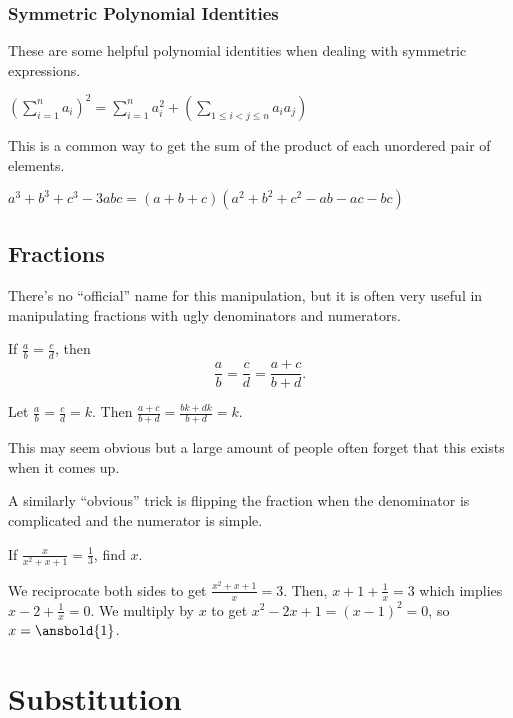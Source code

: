 \documentclass[mast]{lucky}
\begin{document}
\subsubsection{Symmetric Polynomial Identities}
These are some helpful polynomial identities when dealing with symmetric expressions.
\begin{theo}
$(\sum_{i=1}^{n} a_{i})^2 = \sum_{i=1}^{n} a_{i}^2 + (\sum_{1\leq i < j\leq n } a_{i}a_{j})$
\end{theo}
This is a common way to get the sum of the product of each unordered pair of elements. 
\begin{theo}
$a^3+b^3+c^3-3abc=(a+b+c)(a^2+b^2+c^2-ab-ac-bc)$
\end{theo}

\subsection{Fractions}
There's no ``official'' name for this manipulation, but it is often very useful in manipulating fractions with ugly denominators and numerators. 
\begin{theo}
If $\frac{a}{b}=\frac{c}{d}$, then
\[\frac{a}{b}=\frac{c}{d}=\frac{a+c}{b+d}.\]
\end{theo}

\begin{pro}
Let $\frac{a}{b}=\frac{c}{d}=k$. Then $\frac{a+c}{b+d}=\frac{bk+dk}{b+d}=k$.
\end{pro}

This may seem obvious but a large amount of people often forget that this exists when it comes up.

A similarly ``obvious'' trick is flipping the fraction when the denominator is complicated and the numerator is simple.

\begin{exam}[Classic]
If $\frac{x}{x^2+x+1}=\frac{1}{3}$, find $x$.
\end{exam}

\begin{sol}
We reciprocate both sides to get $\frac{x^2+x+1}{x}=3$. Then, $x+1+\frac{1}{x}=3$ which implies $x-2+\frac{1}{x}=0$. We multiply by $x$ to get $x^2-2x+1=(x-1)^2=0$, so $x=\ansbold{1}$.
\end{sol}
\section{Substitution}
\end{document}
